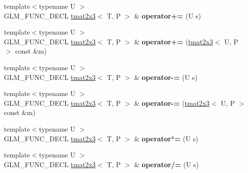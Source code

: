 \begin{DoxyCompactItemize}
\item 
\mbox{\label{structglm_1_1tmat2x3_aee083f086e7c9f50519938741a380cd3}} 
{\footnotesize template$<$typename U $>$ }\\G\+L\+M\+\_\+\+F\+U\+N\+C\+\_\+\+D\+E\+CL \hyperlink{structglm_1_1tmat2x3}{tmat2x3}$<$ T, P $>$ \& {\bfseries operator+=} (U s)
\item 
\mbox{\label{structglm_1_1tmat2x3_ac76cd77cbb00903d4ec4cb7a1ccd386c}} 
{\footnotesize template$<$typename U $>$ }\\G\+L\+M\+\_\+\+F\+U\+N\+C\+\_\+\+D\+E\+CL \hyperlink{structglm_1_1tmat2x3}{tmat2x3}$<$ T, P $>$ \& {\bfseries operator+=} (\hyperlink{structglm_1_1tmat2x3}{tmat2x3}$<$ U, P $>$ const \&m)
\item 
\mbox{\label{structglm_1_1tmat2x3_a2e62101b40eddd5795cd3c9f94315d43}} 
{\footnotesize template$<$typename U $>$ }\\G\+L\+M\+\_\+\+F\+U\+N\+C\+\_\+\+D\+E\+CL \hyperlink{structglm_1_1tmat2x3}{tmat2x3}$<$ T, P $>$ \& {\bfseries operator-\/=} (U s)
\item 
\mbox{\label{structglm_1_1tmat2x3_a7d1c13018b5d2ad3fd2a13fcf03930d1}} 
{\footnotesize template$<$typename U $>$ }\\G\+L\+M\+\_\+\+F\+U\+N\+C\+\_\+\+D\+E\+CL \hyperlink{structglm_1_1tmat2x3}{tmat2x3}$<$ T, P $>$ \& {\bfseries operator-\/=} (\hyperlink{structglm_1_1tmat2x3}{tmat2x3}$<$ U, P $>$ const \&m)
\item 
\mbox{\label{structglm_1_1tmat2x3_a1e3a222eff6b88c77d35ab5efbb0afcf}} 
{\footnotesize template$<$typename U $>$ }\\G\+L\+M\+\_\+\+F\+U\+N\+C\+\_\+\+D\+E\+CL \hyperlink{structglm_1_1tmat2x3}{tmat2x3}$<$ T, P $>$ \& {\bfseries operator$\ast$=} (U s)
\item 
\mbox{\label{structglm_1_1tmat2x3_a38e2ae75159a10a3d8883771a3329b29}} 
{\footnotesize template$<$typename U $>$ }\\G\+L\+M\+\_\+\+F\+U\+N\+C\+\_\+\+D\+E\+CL \hyperlink{structglm_1_1tmat2x3}{tmat2x3}$<$ T, P $>$ \& {\bfseries operator/=} (U s)
\item 
\mbox{\label{structglm_1_1tmat2x3_a13841004a80585a9af1e91ed4413b678}} 

\end{DoxyCompactItemize}
